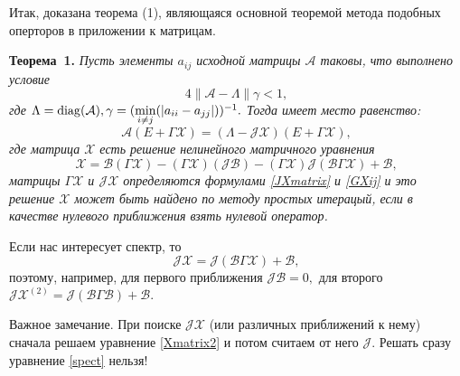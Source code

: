 Итак, доказана теорема (1), являющаяся основной теоремой метода подобных оперторов в приложении к матрицам.

\textbf{Теорема~1.}
{ \it Пусть элементы $a_{ij}$ исходной матрицы $\mathcal{A}$ таковы, что выполнено условие
$$
4\|\mathcal{A} - \Lambda\| \gamma < 1,
$$
где $\Lambda = \operatorname{diag}(\mathcal{A}), \gamma = (\min\limits_{i \neq j}(|a_{ii} - a_{jj}|))^{-1}.$
Тогда имеет место равенство:
$$
\mathcal{A}(E + \Gamma\mathcal{X}) = (\Lambda - \mathcal{JX})(E + \Gamma\mathcal{X}),
$$
где матрица $\mathcal{X}$ есть решение нелинейного матричного уравнения
$$
\mathcal{X} = \mathcal{B}(\Gamma\mathcal{X}) - (\Gamma\mathcal{X})(\mathcal{JB}) - (\Gamma\mathcal{X})\mathcal{J}(\mathcal{B}\Gamma\mathcal{X}) + \mathcal{B},
$$
матрицы $\Gamma\mathcal{X}$ и $\mathcal{JX}$ определяются формулами \eqref{JXmatrix} и \eqref{GXij} и это решение $\mathcal{X}$ может быть найдено по методу простых итерацый, если в качестве нулевого приближения взять нулевой оператор.
}
 
Если нас интересует спектр, то
\begin{equation}\label{spect}
   \mathcal{JX} = \mathcal{J}(\mathcal{B}\Gamma\mathcal{X}) + \mathcal{B},
\end{equation}
поэтому, например, для первого приближения $\mathcal{JB} = 0,$ для второго $\mathcal{JX}^{(2)} = \mathcal{J}(\mathcal{B}\Gamma\mathcal{B})+\mathcal{B}.$

Важное замечание. При поиске $\mathcal{JX}$ (или различных приближений к нему) сначала решаем уравнение \eqref{Xmatrix2} и потом считаем от него $\mathcal{J}.$ Решать сразу уравнение \eqref{spect} нельзя!